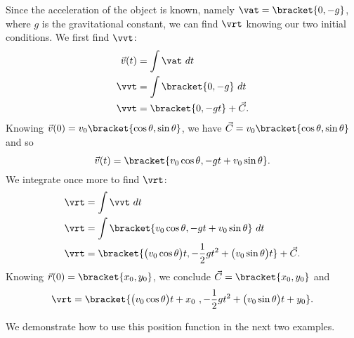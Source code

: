 Since the acceleration of the object is known, namely $\vat =\bracket{0,-g}$, where $g$ is the gravitational constant, we can find $\vrt$ knowing our two initial conditions. We first find $\vvt$:
\begin{align*}
\vec v(t) &= \int \vat \ dt\\
\vvt &= \int\bracket{0,-g}\ dt\\
\vvt &=\bracket{0,-gt}+ \vec C.
\end{align*}
Knowing $\vec v(0) = v_0\bracket{\cos \theta,\sin \theta}$, we have $\vec C = v_0\bracket{\cos\theta,\sin\theta}$ and so
\[\vec v(t) =\bracket{\rule{0pt}{9pt} v_0\cos \theta, -gt+v_0\sin\theta}.\]
We integrate once more to find $\vrt$:
\begin{align*}
\vrt &= \int \vvt\ dt \\
\vrt &= \int\bracket{\rule{0pt}{9pt} v_0\cos \theta, -gt+v_0\sin\theta}\ dt\\
\vrt &=\bracket{\big(v_0\cos \theta\big)t, -\frac12gt^2+\big(v_0\sin\theta\big)t}+ \vec C.
\end{align*}
Knowing $\vec r(0) =\bracket{x_0,y_0}$, we conclude $\vec C =\bracket{x_0,y_0}$ and
\begin{equation}
\vrt
=\bracket{\big(v_0\cos\theta\big)t+x_0\ ,-\frac12gt^2+\big(v_0\sin\theta\big)t+y_0}.
\label{idea:projectile}
\end{equation}


We demonstrate how to use this position function in the next two examples.

